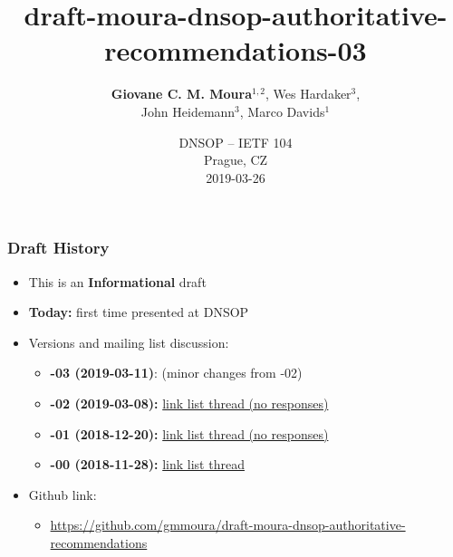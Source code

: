 \documentclass[11pt,show 
notes,notheorems,noamsthm,blank]{beamer} %
\begin{document}
\title{draft-moura-dnsop-authoritative-recommendations-03}  
\author[Moura et. al]{\textbf{Giovane C. M. Moura}$^{1,2}$, Wes Hardaker$^3$, 
\\John Heidemann$^3$, Marco Davids$^1$\\}
\vspace{-0.3cm}


   
   
\date {DNSOP -- IETF 104\\Prague, CZ\\
2019-03-26\\


}  

\frame{\titlepage} 






\begin{frame}
\frametitle{Draft History}


\begin{itemize}


\item This is an \textbf{Informational} draft 
\item \textbf{Today:} first time presented at DNSOP 

\item Versions and mailing list discussion:

\begin{itemize}

  \item \textbf{-03 (2019-03-11)}: (minor changes from -02)   
  \item \textbf{-02 (2019-03-08):}   
\href{https://mailarchive.ietf.org/arch/msg/dnsop/u_w7KI7BkLmWQ7ii0P_PTEYBcus}{
 link  list thread (no responses) }
 
 

  \item \textbf{-01 (2018-12-20):} 
\href{https://mailarchive.ietf.org/arch/msg/dnsop/2R8Ab4-7sKmOY7-XcJ3yLSq6Gcc}{
 link list thread (no responses)} 


  \item \textbf{-00 (2018-11-28):}   
\href{https://mailarchive.ietf.org/arch/msg/dnsop/AMMr6dDDUmShnG90URv6AJCY_VQ}{
 link list thread}

\end{itemize}

\item Github link: 
\begin{itemize}
 \item \small
\url{https://github.com/gmmoura/draft-moura-dnsop-authoritative-recommendations}

\end{itemize}



\end{itemize}


\end{frame}
\end{document}
